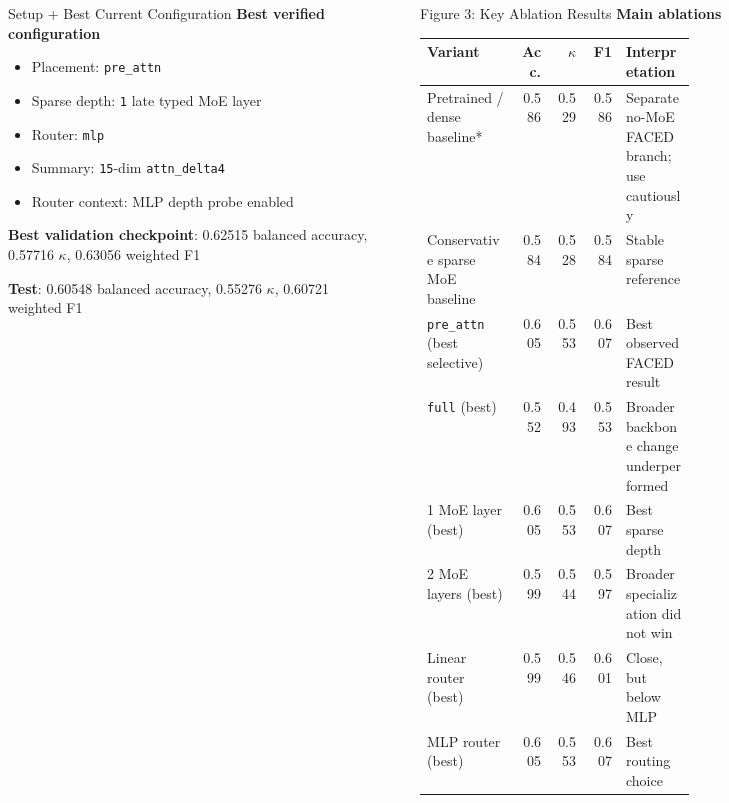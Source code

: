 \documentclass[final]{beamer}
\newlength{\sepwidth}
\newlength{\colwidth}
\newcommand{\separatorcolumn}{\begin{column}{\sepwidth}\end{column}}
\begin{document}
\begin{frame}[t]
\begin{columns}[t]
\begin{column}{\colwidth}
\begin{exampleblock}{Setup + Best Current Configuration}
    \vspace{0.1cm}
    \textbf{Best verified configuration}
    \begin{itemize}
      \item Placement: \texttt{pre\_attn}
      \item Sparse depth: \texttt{1} late typed MoE layer
      \item Router: \texttt{mlp}
      \item Summary: \texttt{15}-dim \texttt{attn\_delta4}
      \item Router context: MLP depth probe enabled
    \end{itemize}

    \vspace{0.1cm}
    \textbf{Best validation checkpoint}: 0.62515 balanced accuracy, 0.57716
    $\kappa$, 0.63056 weighted F1

    \vspace{0.1cm}
    \textbf{Test}: 0.60548 balanced accuracy, 0.55276 $\kappa$, 0.60721
    weighted F1
  \end{exampleblock}

\end{column}

\separatorcolumn

\begin{column}{\colwidth}

  \begin{block}{Figure 3: Key Ablation Results}
    \scriptsize
    \textbf{Main ablations}

    \vspace{0.15cm}
    \begin{tabular}{p{0.34\linewidth} r r r p{0.26\linewidth}}
      \toprule
      \textbf{Variant} & \textbf{Acc.} & \textbf{$\kappa$} & \textbf{F1} & \textbf{Interpretation} \\
      \midrule
      Pretrained / dense baseline* & 0.586 & 0.529 & 0.586 & Separate no-MoE FACED branch; use cautiously \\
      Conservative sparse MoE baseline & 0.584 & 0.528 & 0.584 & Stable sparse reference \\
      \texttt{pre\_attn} (best selective) & 0.605 & 0.553 & 0.607 & Best observed FACED result \\
      \texttt{full} (best) & 0.552 & 0.493 & 0.553 & Broader backbone change underperformed \\
      1 MoE layer (best) & 0.605 & 0.553 & 0.607 & Best sparse depth \\
      2 MoE layers (best) & 0.599 & 0.544 & 0.597 & Broader specialization did not win \\
      Linear router (best) & 0.599 & 0.546 & 0.601 & Close, but below MLP \\
      MLP router (best) & 0.605 & 0.553 & 0.607 & Best routing choice \\
      \bottomrule
    \end{tabular}


\end{block}
\end{column}
\end{columns}
\end{frame}
\end{document}
